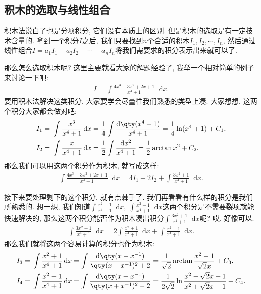 \documentclass{ctexbook}
\newcommand*{\dif}{\mathop{}\!\mathrm{d}}
\begin{document}
{\subsection{积木的选取与线性组合}
积木法说白了也是分项积分, 它们没有本质上的区别. 但是积木的选取是有一定技术含量的. 拿到一个积分$I$之后, 我们只要找到$n$个合适的积木$I_{1},I_{2},\cdots,I_{n}$, 然后通过线性组合$I=a_{1}I_{1}+a_{2}I_{2}+\cdots+a_{n}I_{n}$将我们需要求的积分表示出来就可以了. \par
那么怎么选取积木呢? 这里主要就看大家的解题经验了, 我举一个相对简单的例子来讨论一下吧: 
\begin{align*}
I=\int\frac{4x^{3}+3x^{2}+2x+1}{x^{4}+1}\dif{x}
.\end{align*}
要用积木法解决这类积分, 大家要学会尽量往我们熟悉的类型上凑. 大家想想, 这两个积分大家都会做对吧: 
\begin{align*}
I_{1}={}&\int\frac{x^{3}}{x^{4}+1}\dif{x}=\frac{1}{4}\int\frac{\dif{\qty(x^{4}+1)}}{x^{4}+1}=\frac{1}{4}\ln(x^{4}+1)+C_{1},\\
I_{2}={}&\int\frac{x}{x^{4}+1}\dif{x}=\frac{1}{2}\int\frac{\dif{x^{2}}}{x^{4}+1}=\frac{1}{2}\arctan{x^{2}}+C_{2}
.\end{align*}
那么我们可以用这两个积分作为积木, 就写成这样: 
\begin{align*}
\int\frac{4x^{3}+3x^{2}+2x+1}{x^{4}+1}\dif{x}=4I_{1}+2I_{2}+\int\frac{3x^{2}+1}{x^{4}+1}\dif{x}
.\end{align*}\par
接下来要处理剩下的这个积分, 就有点棘手了. 我们再看看有什么样的积分是我们所熟悉的. 想一想, 我们知道$\int\frac{x^{2}+1}{x^{4}+1}\dif{x},\;\int\frac{x^{2}-1}{x^{4}+1}\dif{x}$这两个积分是不需要裂项就能快速解决的, 那么这两个积分能否作为积木凑出积分$\int\frac{3x^{2}+1}{x^{4}+1}\dif{x}$呢? 哎, 好像可以. 
\begin{align*}
\int\frac{3x^{2}+1}{x^{4}+1}\dif{x}=2\int\frac{x^{2}+1}{x^{4}+1}\dif{x}+\int\frac{x^{2}-1}{x^{4}+1}\dif{x}
.\end{align*}
那么我们就将这两个容易计算的积分也作为积木: 
\begin{align*}
I_{3}={}&\int\frac{x^{2}+1}{x^{4}+1}\dif{x}=\int\frac{\dif{\qty(x-x^{-1})}}{\qty(x-x^{-1})^{2}+2}=\frac{1}{\sqrt{2}}\arctan{\frac{x^{2}-1}{\sqrt{2}x}}+C_{3},\\
I_{4}={}&\int\frac{x^{2}-1}{x^{4}+1}\dif{x}=\int\frac{\dif{\qty(x+x^{-1})}}{\qty(x+x^{-1})^{2}-2}=\frac{1}{2\sqrt{2}}\ln{\frac{x^{2}-\sqrt{2}x+1}{x^{2}+\sqrt{2}x+1}}+C_{4}
.\end{align*}\par
}
\end{document}
